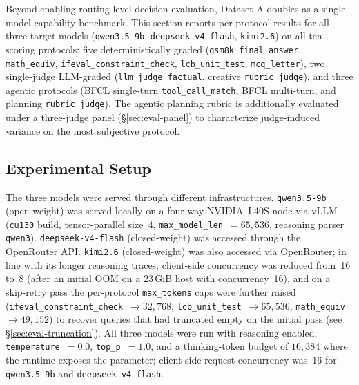 \documentclass[11pt,a4paper]{article}
\begin{document}
Beyond enabling routing-level decision evaluation, Dataset A doubles as a
single-model capability benchmark. This section reports per-protocol results
for all three target models (\texttt{qwen3.5-9b}, \texttt{deepseek-v4-flash},
\texttt{kimi2.6}) on all ten scoring protocols: five deterministically graded
(\texttt{gsm8k\_final\_answer}, \texttt{math\_equiv},
\texttt{ifeval\_constraint\_check}, \texttt{lcb\_unit\_test},
\texttt{mcq\_letter}), two single-judge LLM-graded
(\texttt{llm\_judge\_factual}, creative \texttt{rubric\_judge}), and three
agentic protocols (BFCL single-turn \texttt{tool\_call\_match}, BFCL multi-turn,
and planning \texttt{rubric\_judge}). The agentic planning rubric is
additionally evaluated under a three-judge panel (§\ref{sec:eval-panel}) to
characterize judge-induced variance on the most subjective protocol.

\subsection{Experimental Setup}

The three models were served through different infrastructures.
\texttt{qwen3.5-9b} (open-weight) was served locally on a four-way NVIDIA~L40S
node via vLLM (\texttt{cu130} build, tensor-parallel size~4,
\texttt{max\_model\_len}~$=65{,}536$, reasoning parser \texttt{qwen3}).
\texttt{deepseek-v4-flash} (closed-weight) was accessed through the OpenRouter
API. \texttt{kimi2.6} (closed-weight) was also accessed via OpenRouter; in line
with its longer reasoning traces, client-side concurrency was reduced from~16
to~8 (after an initial OOM on a $23\,$GiB host with concurrency~16), and on
a skip-retry pass the per-protocol \texttt{max\_tokens} caps were further raised
(\texttt{ifeval\_constraint\_check}~$\to 32{,}768$,
\texttt{lcb\_unit\_test}~$\to 65{,}536$, \texttt{math\_equiv}~$\to 49{,}152$)
to recover queries that had truncated empty on the initial pass (see
§\ref{sec:eval-truncation}). All three models were run with reasoning enabled,
\texttt{temperature}~$=0.0$, \texttt{top\_p}~$=1.0$, and a thinking-token
budget of $16{,}384$ where the runtime exposes the parameter; client-side
request concurrency was~16 for \texttt{qwen3.5-9b} and \texttt{deepseek-v4-flash}.
\end{document}
